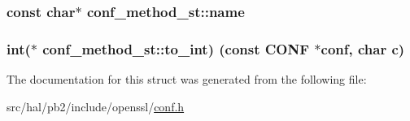 \subsubsection[{\texorpdfstring{name}{name}}]{\setlength{\rightskip}{0pt plus 5cm}const char$\ast$ conf\+\_\+method\+\_\+st\+::name}\hypertarget{structconf__method__st_a3349eb0f994901012106e16ffbba7a19}{}\label{structconf__method__st_a3349eb0f994901012106e16ffbba7a19}
\subsubsection[{\texorpdfstring{to\+\_\+int}{to_int}}]{\setlength{\rightskip}{0pt plus 5cm}int($\ast$ conf\+\_\+method\+\_\+st\+::to\+\_\+int) (const {\bf C\+O\+NF} $\ast$conf, char c)}\hypertarget{structconf__method__st_afa9903c936cd9de9822cc65f4fe0b34f}{}\label{structconf__method__st_afa9903c936cd9de9822cc65f4fe0b34f}


The documentation for this struct was generated from the following file\+:\begin{DoxyCompactItemize}
\item 
src/hal/pb2/include/openssl/\hyperlink{conf_8h}{conf.\+h}\end{DoxyCompactItemize}
